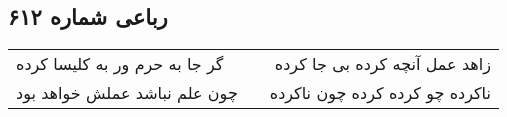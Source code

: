 \begin{center}
\section*{رباعی شماره ۶۱۲}
\label{sec:sh612}
\begin{longtable}{l p{0.5cm} r}
گر جا به حرم ور به کلیسا کرده
&&
زاهد عمل آنچه کرده بی جا کرده
\\
چون علم نباشد عملش خواهد بود
&&
ناکرده چو کرده کرده چون ناکرده
\\
\end{longtable}
\end{center}
